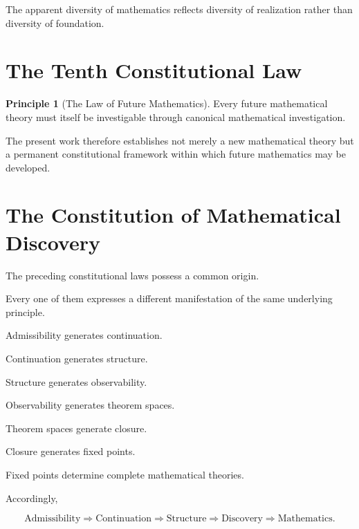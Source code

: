 \documentclass[13pt,openany]{book}
\theoremstyle{plain}
\theoremstyle{definition}
\newtheorem{principle}{Principle}[chapter]
\begin{document}
The apparent diversity of mathematics reflects diversity of realization rather
than diversity of foundation.

\section{The Tenth Constitutional Law}

\begin{principle}[The Law of Future Mathematics]

Every future mathematical theory must itself be investigable through canonical
mathematical investigation.

\end{principle}

The present work therefore establishes not merely a new mathematical theory but
a permanent constitutional framework within which future mathematics may be
developed.

\section{The Constitution of Mathematical Discovery}

The preceding constitutional laws possess a common origin.

Every one of them expresses a different manifestation of the same underlying
principle.

Admissibility generates continuation.

Continuation generates structure.

Structure generates observability.

Observability generates theorem spaces.

Theorem spaces generate closure.

Closure generates fixed points.

Fixed points determine complete mathematical theories.

Accordingly,

\[
\boxed{
\text{Admissibility}
\Longrightarrow
\text{Continuation}
\Longrightarrow
\text{Structure}
\Longrightarrow
\text{Discovery}
\Longrightarrow
\text{Mathematics}.
}
\]
\end{document}
